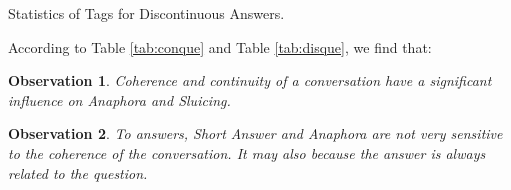 \documentclass[bsc,frontabs,twoside,singlespacing,parskip,deptreport]{infthesis}     %
\newtheorem{observation}{Observation}[chapter]
\begin{document}
\begin{minipage}{\textwidth}
\begin{minipage}[t]{0.45\textwidth}
        \end{minipage}
        \begin{minipage}[t]{0.45\textwidth}
        \centering
        \makeatletter{}\makeatother
{}
\caption{Statistics of Tags for Discontinuous Answers.}
\label{tab:disans}

        \end{minipage}
    \end{minipage}


According to Table \ref{tab:conque} and Table \ref{tab:disque}, we find that:

\begin{observation}
Coherence and continuity of a conversation have a significant influence on Anaphora and Sluicing.
\end{observation}

\begin{observation}
To answers, Short Answer and Anaphora are not very sensitive to the coherence of the conversation. It may also because the answer is always related to the question.
\end{observation}
\end{document}
